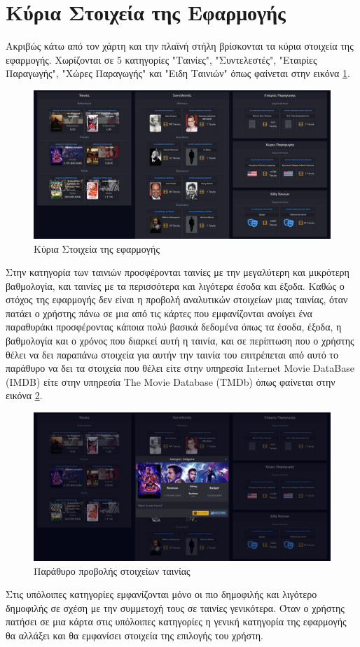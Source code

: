 \section{Κύρια Στοιχεία της Εφαρμογής}
Ακριβώς κάτω από τον χάρτη και την πλαϊνή στήλη βρίσκονται τα κύρια στοιχεία της εφαρμογής. Χωρίζονται σε 5 κατηγορίες "Ταινίες", "Συντελεστές", "Εταιρίες Παραγωγής", "Χώρες Παραγωγής" και "Ειδη Ταινιών" όπως φαίνεται στην εικόνα \ref{demo:insights}. 

\begin{figure}[H]
  \centering
  \includegraphics[width=145mm]{Chapters/6 - Manual/Images/main_page_insights.png}
  \caption{Κύρια Στοιχεία της εφαρμογής}
  \label{demo:insights}
\end{figure}

Στην κατηγορία των ταινιών προσφέρονται ταινίες με την μεγαλύτερη και μικρότερη βαθμολογία, και ταινίες με τα περισσότερα και λιγότερα έσοδα και έξοδα. Καθώς ο στόχος της εφαρμογής δεν είναι η προβολή αναλυτικών στοιχείων μιας ταινίας, όταν πατάει ο χρήστης πάνω σε μια από τις κάρτες που εμφανίζονται ανοίγει ένα παραθυράκι προσφέροντας κάποια πολύ βασικά δεδομένα όπως τα έσοδα, έξοδα, η βαθμολογία και ο χρόνος που διαρκεί αυτή η ταινία, και σε περίπτωση που ο χρήστης θέλει να δει παραπάνω στοιχεία για αυτήν την ταινία του επιτρέπεται από αυτό το παράθυρο να δει τα στοιχεία που θέλει είτε στην υπηρεσία Internet Movie DataBase (IMDB) είτε στην υπηρεσία The Movie Database (TMDb) όπως φαίνεται στην εικόνα \ref{demo:movie:modal}.

\begin{figure}[H]
  \centering
  \includegraphics[width=145mm]{Chapters/6 - Manual/Images/main_page_insights_modal.png}
  \caption{Παράθυρο προβολής στοιχείων ταινίας}
  \label{demo:movie:modal}
\end{figure}

Στις υπόλοιπες κατηγορίες εμφανίζονται μόνο οι πιο δημοφιλής και λιγότερο δημοφιλής σε σχέση με την συμμετοχή τους σε ταινίες γενικότερα. Όταν ο χρήστης πατήσει σε μια κάρτα στις υπόλοιπες κατηγορίες η γενική κατηγορία της εφαρμογής θα αλλάξει και θα εμφανίσει στοιχεία της επιλογής του χρήστη.


